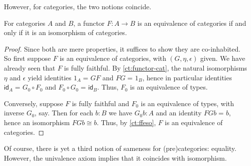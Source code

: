 \documentclass{amsart}
\newcommand{\id}[3][]{\ensuremath{#2 =_{#1} #3}\xspace}
\newcommand{\idfunc}[1][]{\ensuremath{\mathsf{id}_{#1}}\xspace}
\theoremstyle{definition}
\theoremstyle{remark}
\numberwithin{equation}{section}
\begin{document}
However, for categories, the two notions coincide.

\begin{lem}\label{ct:eqv-levelwise}
  For categories $A$ and $B$, a functor $F:A\to B$ is an equivalence of categories if and only if it is an isomorphism of categories.
\end{lem}
\begin{proof}
  Since both are mere properties, it suffices to show they are co-inhabited.
  So first suppose $F$ is an equivalence of categories, with $(G,\eta,\epsilon)$ given.
  We have already seen that $F$ is fully faithful.
  By \autoref{ct:functor-cat}, the natural isomorphisms $\eta$ and $\epsilon$ yield identities $\id{1_A}{GF}$ and $\id{FG}{1_B}$, hence in particular identities $\id{\idfunc[A]}{G_0\circ F_0}$ and $\id{F_0\circ G_0}{\idfunc[B]}$.
Thus, $F_0$ is an equivalence of types.

  Conversely, suppose $F$ is fully faithful and $F_0$ is an equivalence of types, with inverse $G_0$, say.
  Then for each $b:B$ we have $G_0 b:A$ and an identity $\id{FGb}{b}$, hence an isomorphism $FGb\cong b$.
  Thus, by \autoref{ct:ffeso}, $F$ is an equivalence of categories.
\end{proof}

Of course, there is yet a third notion of sameness for (pre)categories: equality.
However, the univalence axiom implies that it coincides with isomorphism.
\end{document}
